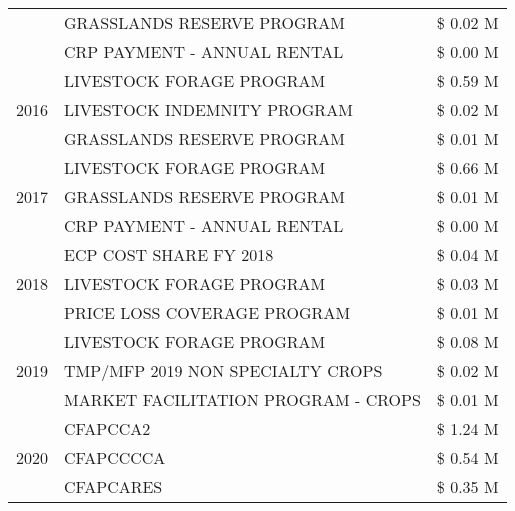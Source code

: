 \begin{tabular}{llr}
 & GRASSLANDS RESERVE PROGRAM & \$ 0.02 M \\
 & CRP PAYMENT - ANNUAL RENTAL & \$ 0.00 M \\
\cline{1-3}
\multirow[t]{3}{*}{2016} & LIVESTOCK FORAGE PROGRAM                      & \$ 0.59 M \\
 & LIVESTOCK INDEMNITY PROGRAM                   & \$ 0.02 M \\
 & GRASSLANDS RESERVE PROGRAM                    & \$ 0.01 M \\
\cline{1-3}
\multirow[t]{3}{*}{2017} & LIVESTOCK FORAGE PROGRAM & \$ 0.66 M \\
 & GRASSLANDS RESERVE PROGRAM & \$ 0.01 M \\
 & CRP PAYMENT - ANNUAL RENTAL & \$ 0.00 M \\
\cline{1-3}
\multirow[t]{3}{*}{2018} & ECP COST SHARE FY 2018 & \$ 0.04 M \\
 & LIVESTOCK FORAGE PROGRAM & \$ 0.03 M \\
 & PRICE LOSS COVERAGE PROGRAM & \$ 0.01 M \\
\cline{1-3}
\multirow[t]{3}{*}{2019} & LIVESTOCK FORAGE PROGRAM & \$ 0.08 M \\
 & TMP/MFP 2019 NON SPECIALTY CROPS & \$ 0.02 M \\
 & MARKET FACILITATION PROGRAM - CROPS & \$ 0.01 M \\
\cline{1-3}
\multirow[t]{3}{*}{2020} & CFAPCCA2 & \$ 1.24 M \\
 & CFAPCCCCA & \$ 0.54 M \\
 & CFAPCARES & \$ 0.35 M \\
\cline{1-3}
\bottomrule
\end{tabular}
